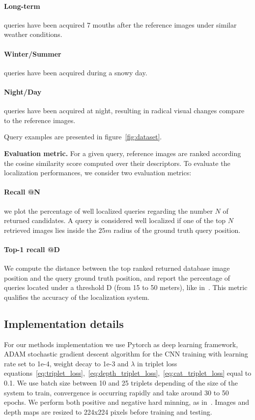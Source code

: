 	\paragraph{Long-term} queries have been acquired 7 mouths after the reference images under similar weather conditions.
	\paragraph{Winter/Summer} queries have been acquired during a snowy day.
	\paragraph{Night/Day} queries have been acquired at night, resulting in radical visual changes compare to the reference images.

Query examples are presented in figure~\ref{fig:dataset}.
	
\vspace{4pt}\noindent\textbf{Evaluation metric.} For a given query, reference images are ranked according the cosine similarity score computed over their descriptors. To evaluate the localization performances, we consider two evaluation metrics:
	\setcounter{paragraph}{0}
	\paragraph{Recall @N} we plot the percentage of well localized queries regarding the number $N$ of returned candidates. A query is considered well localized if one of the top $N$ retrieved images lies inside the $25m$ radius of the ground truth query position.
	\paragraph{Top-1 recall @D} We compute the distance between the top ranked returned database image position and the query ground truth position, and report the percentage of queries located under a threshold D (from 15 to 50 meters), like in~\cite{Zamir2014}. This metric qualifies the accuracy of the localization system.

\subsection{Implementation details}
\label{subsec:implementation}

For our methods implementation we use Pytorch as deep learning framework, ADAM stochastic gradient descent algorithm for the CNN training with learning rate set to 1e-4, weight decay to 1e-3 and $\lambda$ in triplet loss equations~\ref{eq:triplet_loss},~\ref{eq:depth_triplet_loss},~\ref{eq:cat_triplet_loss} equal to 0.1. We use batch size between 10 and 25 triplets depending of the size of the system to train, convergence is occurring rapidly and take around 30 to 50 epochs. We perform both positive and negative hard minning, as in~\cite{Radenovic2017}. Images and depth maps are resized to 224x224 pixels before training and testing.

